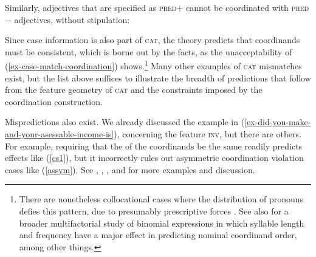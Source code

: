 \eal
\label{pp2}

\zl

Similarly, adjectives that are specified as \textsc{pred}$+$ cannot be
coordinated with  \textsc{pred}$-$ adjectives, without stipulation:

\eal
{}
\zl

\noindent
Since case information is also part of \textsc{cat},  the theory
predicts that coordinands must be consistent, which is borne out by the
facts, as the unacceptability of  (\ref{ex-case-match-coordination}) shows.\footnote{There are nonetheless collocational cases where the distribution of pronouns defies this pattern, due to presumably prescriptive forces \citep{grano}. See also \citet[105, 107]{binomial} for a broader multifactorial study of binomial expressions in which syllable length and  frequency have a major effect in predicting nominal coordinand order, among other things.}
 Many other examples of \textsc{cat} mismatches exist, but the  list above suffices to
illustrate the breadth of predictions that follow from the feature geometry of \textsc{cat} and the constraints imposed by
the coordination construction.

\eal
\label{ex-case-match-coordination}
\zl




Mispredictions also exist. We already discussed the example in (\ref{ex-did-you-make-and-your-asessable-income-is}), concerning the feature \textsc{inv}, but there are others. For example, requiring that the \slashv of the coordinands be the same readily predicts  effects like 
(\ref{cs1}), but it incorrectly rules out asymmetric coordination violation cases like (\ref{assym}). 
See \citet{goldsmith}, \citet{lakoff86}, \citet{levinprince86}, and \citet{kehler} for more examples and discussion.


\eal
\label{cs1}

